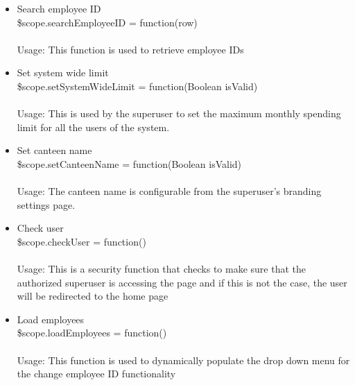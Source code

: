 \documentclass[a4paper,12pt]{report}
\begin{document}
\begin{enumerate}
\begin{itemize}
		\item Search employee ID \\ \$scope.searchEmployeeID = function(row) 
		\\ \\ Usage: This function is used to retrieve employee IDs 
		\item Set system wide limit \\ \$scope.setSystemWideLimit = function(Boolean isValid)  \\ \\ Usage: This is used by the superuser to set the maximum monthly spending limit for all the users of the system.
		 \item Set canteen name \\ \$scope.setCanteenName = function(Boolean isValid) 
		\\ \\ Usage: The canteen name is configurable from the superuser's branding settings page.
		\item Check user \\ \$scope.checkUser = function() 
		\\ \\Usage: This is a security function that checks to make sure that the authorized superuser is accessing the page and if this is not the case, the user will be redirected to the home page
		\item Load employees \\ \$scope.loadEmployees = function() 
		\\ \\Usage: This function is used to dynamically populate the drop down menu for the change employee ID functionality
	\end{itemize}
\end{enumerate}
\end{document}

